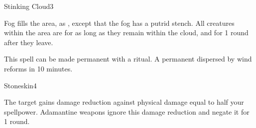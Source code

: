 \begin{spellsection}{Stinking Cloud}{3}
    \begin{spellheader}
    \end{spellheader}
    \begin{spellcontent}
        \begin{spelltargetinginfo}
        \end{spelltargetinginfo}
        \begin{spelleffects}
            \spelleffect Fog fills the area, as , except that the fog has a putrid stench. All creatures within the area are \sickened for as long as they remain within the cloud, and for 1 round after they leave.
            \spelldur \durshort
        \end{spelleffects}
    \end{spellcontent}
    \begin{spellfooter}
        \spellnotes This spell can be made permanent with a  ritual. A permanent  dispersed by wind reforms in 10 minutes. \fogspellnotes \fogwindspellnotes

        \physicalspellnotes
        \miscastyou
    \end{spellfooter}
\end{spellsection}

\begin{spellsection}{Stoneskin}{4}
    \begin{spellheader}
    \end{spellheader}
    \begin{spellcontent}
        \begin{spelltargetinginfo}
        \end{spelltargetinginfo}
        \begin{spelleffects}
            \spelleffect The target gains damage reduction against physical damage equal to half your spellpower. Adamantine weapons ignore this damage reduction and negate it for 1 round.
            \spelldur \durpersonallong
        \end{spelleffects}
    \end{spellcontent}
    \begin{spellfooter}
        \miscastexplode
    \end{spellfooter}
\end{spellsection}

